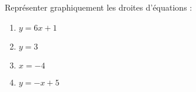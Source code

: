 
\begin{exercice}\label{exosmath-0607}

    Représenter graphiquement les droites d'équations :
    \begin{multicols}{2}
        \begin{enumerate}
            \item
                \( y=6x+1\)
            \item
                \( y=3\)
            \item
                \( x=-4\)
            \item
                \( y=-x+5\)
        \end{enumerate}
    \end{multicols}

\end{exercice}
